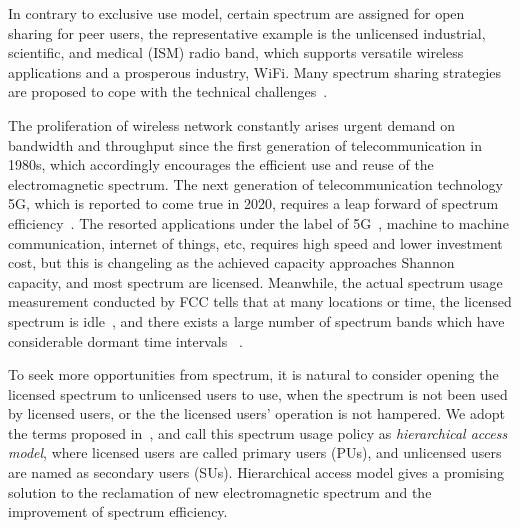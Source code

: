 %
In contrary to exclusive use model, certain spectrum are assigned for open sharing for peer users, the representative example is the unlicensed industrial, scientific, and medical (\gls{ISM}) radio band, which supports versatile wireless applications and a prosperous industry, \ie WiFi.
Many spectrum sharing strategies are proposed to cope with the technical challenges~\cite{Ko_DistributedCA}.

%
The proliferation of wireless network constantly arises urgent demand on bandwidth and throughput since the first generation of telecommunication in 1980s, which accordingly encourages the efficient use and reuse of the electromagnetic spectrum.
The next generation of telecommunication technology \gls{5G}, which is reported to come true in 2020, requires a leap forward of spectrum efficiency~\cite{5G_2014}.
The resorted applications under the label of 5G~\cite{5directions5G_2014}, \ie machine to machine communication, internet of things, etc, requires high speed and lower investment cost, but this is changeling as the achieved capacity approaches Shannon capacity, and most spectrum are licensed.
Meanwhile, the actual spectrum usage measurement conducted by FCC tells that at many locations or time, the licensed spectrum is idle~\cite{FCC_spectrumEfficiency_2002}, and there exists a large number of spectrum bands which have considerable dormant time intervals ~\cite{Akyildiz06survey}.

%
To seek more opportunities from spectrum, it is natural to consider opening the licensed spectrum to unlicensed users to use, when the spectrum is not been used by licensed users, or the the licensed users' operation is not hampered.
We adopt the terms proposed in~\cite{zhao_survey_DSA_2007}, and call this spectrum usage policy as \textit{hierarchical access model}, where licensed users are called primary users (\glspl{PU}), and unlicensed users are named as secondary users (\glspl{SU}).
Hierarchical access model gives a promising solution to the reclamation of new electromagnetic spectrum and the improvement of spectrum efficiency.




